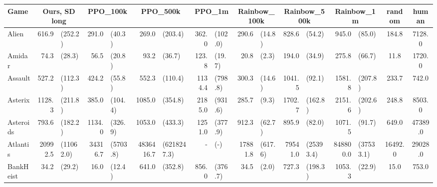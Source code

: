 \begin{landscape}
\begin{changemargin}{0cm}{0cm}
\begin{center}
\vspace*{\fill}
\setlength{\tabcolsep}{5pt}
\begin{table}[!htbp]
\scriptsize
\begin{tabular}{l|rlrlrlrlrlrlrlcc}

Game & \multicolumn{2}{c}{Ours, SD long}  &     \multicolumn{2}{c}{PPO\_100k}   &     \multicolumn{2}{c}{PPO\_500k} &     \multicolumn{2}{c}{PPO\_1m}   &     \multicolumn{2}{c}{Rainbow\_100k} &          \multicolumn{2}{c}{Rainbow\_500k}	&     \multicolumn{2}{c}{Rainbow\_1m} &		random &		human\\


\midrule
Alien          &    616.9 &    (252.2) &    291.0 &    (40.3) &      269.0 &      (203.4) &    362.0 &    (102.0) &    290.6 &   (14.8) &    828.6 &     (54.2) &     945.0 &     (85.0) &    184.8 &   7128.0 \\
Amidar         &     74.3 &     (28.3) &     56.5 &    (20.8) &       93.2 &       (36.7) &    123.8 &     (19.7) &     20.8 &    (2.3) &    194.0 &     (34.9) &     275.8 &     (66.7) &     11.8 &   1720.0 \\
Assault        &    527.2 &    (112.3) &    424.2 &    (55.8) &      552.3 &      (110.4) &   1134.4 &    (798.8) &    300.3 &   (14.6) &   1041.5 &     (92.1) &    1581.8 &    (207.8) &    233.7 &    742.0 \\
Asterix        &   1128.3 &    (211.8) &    385.0 &   (104.4) &     1085.0 &      (354.8) &   2185.0 &    (931.6) &    285.7 &    (9.3) &   1702.7 &    (162.8) &    2151.6 &    (202.6) &    248.8 &   8503.0 \\
Asteroids      &    793.6 &    (182.2) &   1134.0 &   (326.9) &     1053.0 &      (433.3) &   1251.0 &    (377.9) &    912.3 &   (62.7) &    895.9 &     (82.0) &    1071.5 &     (91.7) &    649.0 &  47389.0 \\
Atlantis       &  20992.5 &  (11062.0) &  34316.7 &  (5703.8) &  4836416.7 &  (6218247.3) &      - &      (-) &  17881.8 &  (617.6) &  79541.0 &  (25393.4) &  848800.0 &  (37533.1) &  16492.0 &  29028.0 \\
BankHeist      &     34.2 &     (29.2) &     16.0 &    (12.4) &      641.0 &      (352.8) &    856.0 &    (376.7) &     34.5 &    (2.0) &    727.3 &    (198.3) &    1053.3 &     (22.9) &     15.0 &    753.0 \\

\end{tabular}
\end{table}
\end{center}
\end{changemargin}
\end{landscape}
